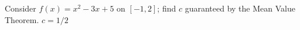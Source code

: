{Consider $f(x) = x^2-3x+5$ on $[-1,2]$; find $c$ guaranteed by the Mean Value Theorem.
}
{$c=1/2$
}
